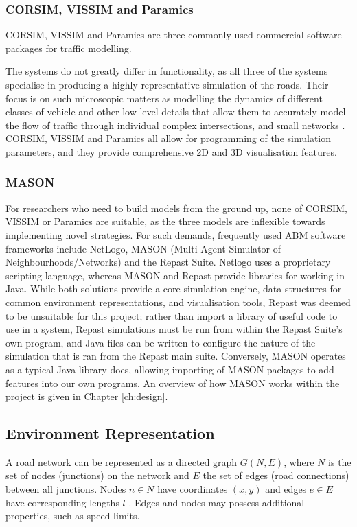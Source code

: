 \subsubsection{CORSIM, VISSIM and Paramics}

CORSIM, VISSIM and Paramics are three commonly used commercial software packages for traffic modelling.

The systems do not greatly differ in functionality, as all three of the systems specialise in producing a highly representative simulation of the roads. Their focus is on such microscopic matters as modelling the dynamics of different classes of vehicle and other low level details that allow them to accurately model the flow of traffic through individual complex intersections, and small networks \cite{Choa2004CORSIMYou}.
CORSIM, VISSIM and Paramics all allow for programming of the simulation parameters, and they provide comprehensive 2D and 3D visualisation features.


\subsubsection{MASON}

For researchers who need to build models from the ground up, none of CORSIM, VISSIM or Paramics are suitable, as the three models are inflexible towards implementing novel strategies. For such demands, frequently used ABM software frameworks include NetLogo, MASON (Multi-Agent Simulator of Neighbourhoods/Networks) and the Repast Suite. Netlogo uses a proprietary scripting language, whereas MASON and Repast provide libraries for working in Java. While  both solutions provide a core simulation engine, data structures for common environment representations, and visualisation tools, Repast was deemed to be unsuitable for this project; rather than import a library of useful code to use in a system, Repast simulations must be run from within the Repast Suite's own program, and Java files can be written to configure the nature of the simulation that is ran from the Repast main suite. Conversely, MASON operates as a typical Java library does, allowing importing of MASON packages to add features into our own programs. An overview of how MASON works within the project is given in Chapter \ref{ch:design}.


\subsection{Environment Representation}
A road network can be represented as a directed graph $G (N,E)$, where $N$ is the set of nodes (junctions) on the network and $E$ the set of edges (road connections) between all junctions. Nodes $n \in N$ have coordinates $(x,y)$ and edges $e \in E$ have corresponding lengths $l$ \cite{Madireddy2011AnManagement}. Edges and nodes may possess additional properties, such as speed limits.

